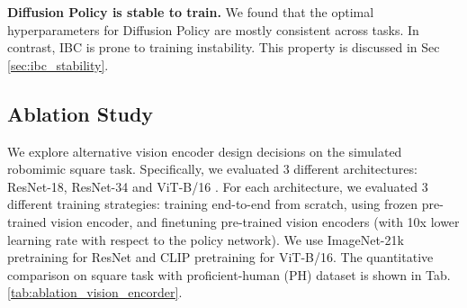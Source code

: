 

\textbf{Diffusion Policy is stable to train.}
We found that the optimal hyperparameters for Diffusion Policy are mostly consistent across tasks.  In contrast,  IBC \cite{ibc} is prone to training instability. This property is discussed in Sec \ref{sec:ibc_stability}.



\subsection{Ablation Study}
\label{sec:arch_ablation}
We explore alternative vision encoder design decisions on the simulated robomimic square task.
Specifically, we evaluated 3 different architectures: 
ResNet-18, ResNet-34 \cite{resnet} 
and ViT-B/16 \cite{dosovitskiy2020image}. 
For each architecture, we evaluated 3 different training strategies:
training end-to-end from scratch,
using frozen pre-trained vision encoder, 
and finetuning pre-trained vision encoders (with 10x lower learning rate with respect to the policy network).
We use ImageNet-21k \cite{ridnik2021imagenet21k} pretraining for ResNet and CLIP \cite{radford2021learning} pretraining for ViT-B/16.
The quantitative comparison on square task with proficient-human (PH) dataset is shown in Tab. \ref{tab:ablation_vision_encorder}.

